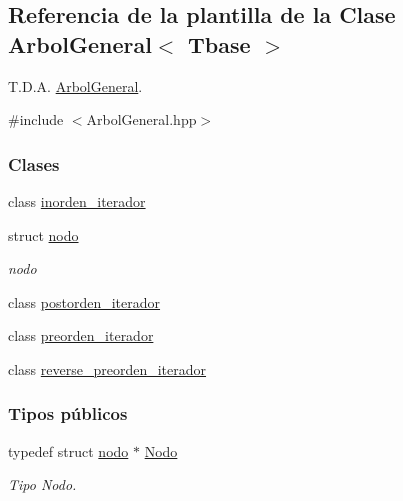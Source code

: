 \hypertarget{classArbolGeneral}{\subsection{Referencia de la plantilla de la Clase Arbol\-General$<$ Tbase $>$}
\label{classArbolGeneral}
}


T.\-D.\-A. \hyperlink{classArbolGeneral}{Arbol\-General}.  




{\ttfamily \#include $<$Arbol\-General.\-hpp$>$}

\subsubsection*{Clases}
\begin{DoxyCompactItemize}
\item 
class \hyperlink{classArbolGeneral_1_1inorden__iterador}{inorden\-\_\-iterador}
\item 
struct \hyperlink{structArbolGeneral_1_1nodo}{nodo}
\begin{DoxyCompactList}\small\item\em nodo \end{DoxyCompactList}\item 
class \hyperlink{classArbolGeneral_1_1postorden__iterador}{postorden\-\_\-iterador}
\item 
class \hyperlink{classArbolGeneral_1_1preorden__iterador}{preorden\-\_\-iterador}
\item 
class \hyperlink{classArbolGeneral_1_1reverse__preorden__iterador}{reverse\-\_\-preorden\-\_\-iterador}
\end{DoxyCompactItemize}
\subsubsection*{Tipos públicos}
\begin{DoxyCompactItemize}
\item 
typedef struct \hyperlink{structArbolGeneral_1_1nodo}{nodo} $\ast$ \hyperlink{classArbolGeneral_a12cc1b74a9095d89bc7334290d332f7a}{Nodo}
\begin{DoxyCompactList}\small\item\em Tipo Nodo. \end{DoxyCompactList}\end{DoxyCompactItemize}
